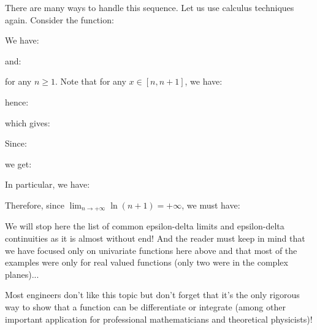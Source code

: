 \begin{enumerate}
		There are many ways to handle this sequence. Let us use calculus techniques again. Consider the function:
		
		We have:
		
		and:
		
		for any $n \geq 1$. Note that for any $x \in[n, n+1]$, we have:
		
		hence:
		
		which gives:
		
		Since:
		
		we get:
		
		In particular, we have:
		
		Therefore, since $\lim _{n \rightarrow +\infty} \ln (n+1)=+\infty$, we must have:
		
	\end{enumerate}
	We will stop here the list of common epsilon-delta limits and epsilon-delta continuities as it is almost without end! And the reader must keep in mind that we have focused only on univariate functions here above and that most of the examples were only for real valued functions (only two were in the complex planes)...
	
	Most engineers don't like this topic but don't forget that it's the only rigorous way to show that a function can be differentiate or integrate (among other important application for professional mathematicians and theoretical physicists)!
	
